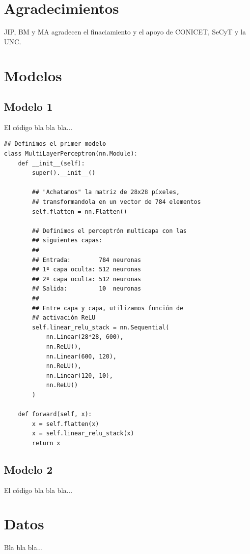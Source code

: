\documentclass[aps,prl,twocolumn,groupedaddress]{revtex4-2}
\begin{document}
\section{Agradecimientos}

\begin{acknowledgments}
JIP, BM y MA agradecen el finaciamiento y el apoyo de CONICET, SeCyT y la UNC.
\end{acknowledgments}



\onecolumngrid

\appendix

\section{Modelos}

\subsection{Modelo 1}

El código bla bla bla...

\begin{verbatim}
## Definimos el primer modelo
class MultiLayerPerceptron(nn.Module):
    def __init__(self):
        super().__init__()

        ## "Achatamos" la matriz de 28x28 píxeles, 
        ## transformandola en un vector de 784 elementos
        self.flatten = nn.Flatten()

        ## Definimos el perceptrón multicapa con las
        ## siguientes capas:
        ##
        ## Entrada:        784 neuronas
        ## 1º capa oculta: 512 neuronas
        ## 2º capa oculta: 512 neuronas
        ## Salida:         10  neuronas
        ##
        ## Entre capa y capa, utilizamos función de 
        ## activación ReLU
        self.linear_relu_stack = nn.Sequential(
            nn.Linear(28*28, 600),
            nn.ReLU(),
            nn.Linear(600, 120),
            nn.ReLU(),
            nn.Linear(120, 10),
            nn.ReLU()
        )

    def forward(self, x):
        x = self.flatten(x)
        x = self.linear_relu_stack(x)
        return x
\end{verbatim}

\subsection{Modelo 2}

El código bla bla bla...

\section{Datos}

Bla bla bla...
\end{document}
